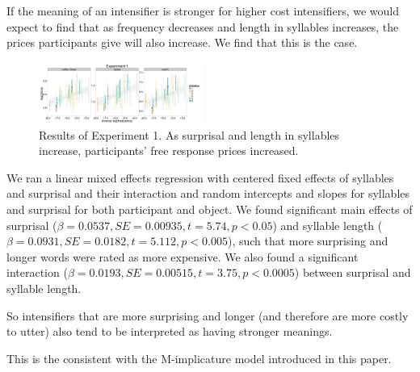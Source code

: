 \documentclass[10pt,letterpaper]{article}
\newcommand{\todo}[1]{{\color{red}#1}}
\begin{document}
If the meaning of an intensifier is stronger for higher cost intensifiers, we would expect to find that as frequency decreases and length in syllables increases, the prices participants give will also increase. We find that this is the case.

\begin{figure}[ht]
\begin{center}
\includegraphics[width=0.48\textwidth]{analysis_files_for_writeup/images/exp1-plot.png}
\end{center}
\caption{Results of Experiment 1. As surprisal and length in syllables increase, participants' free response prices increased.} 
\label{exp1-plot}
\end{figure}

We ran a linear mixed effects regression with centered fixed effects of syllables and surprisal and their interaction and random intercepts and slopes for syllables and surprisal for both participant and object.
We found significant main effects of surprisal ($\beta=0.0537, SE=0.00935, t=5.74, p<0.05$) and syllable length ($\beta=0.0931, SE=0.0182, t=5.112, p<0.005$), such that more surprising and longer words were rated as more expensive. We also found a significant interaction ($\beta=0.0193, SE=0.00515, t=3.75, p<0.0005$) between surprisal and syllable length.%

So intensifiers that are more surprising and longer (and therefore are more costly to utter) also tend to be interpreted as having stronger meanings.

This is the consistent with the M-implicature model introduced in this paper.

\end{document}
